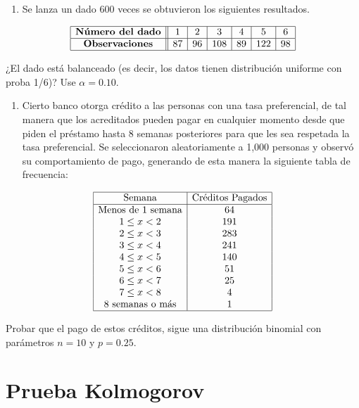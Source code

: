 \documentclass[
  a4paper,
  oneside,
  openany]{book}
\providecommand{\tightlist}{%
  \setlength{\itemsep}{0pt}\setlength{\parskip}{0pt}}
\begin{document}
\begin{enumerate}
\def\labelenumi{\arabic{enumi}.}
\tightlist
\item
  Se lanza un dado 600 veces se obtuvieron los siguientes resultados.
\end{enumerate}

\[
\begin{array}{|c ||c |c |c|c|c|c|}
\hline 
\textbf{Número del dado} & 1& 2& 3&4&5&6 \\
\hline 
\textbf{Observaciones} & 87 &  96 &108&89&122&98 \\
 \hline 
\end{array}
\]

¿El dado está balanceado (es decir, los datos tienen distribución uniforme con proba 1/6)? Use \(\alpha=0.10.\)

\begin{enumerate}
\def\labelenumi{\arabic{enumi}.}
\setcounter{enumi}{1}
\tightlist
\item
  Cierto banco otorga crédito a las personas con una tasa preferencial, de tal manera que los acreditados pueden pagar en cualquier momento desde que piden el préstamo hasta 8 semanas posteriores para que les sea respetada la tasa preferencial. Se seleccionaron aleatoriamente a 1,000 personas y observó su comportamiento de pago, generando de esta manera la siguiente tabla de frecuencia:
\end{enumerate}

\[
\begin{array}{|c|c|  }
\hline
\mbox{Semana}& \mbox{Créditos Pagados}\\
\hline
\mbox{Menos de 1  semana} &64\\
1 \leq x < 2& 191\\
2 \leq  x < 3 &283\\
3 \leq  x < 4 &241\\
4 \leq  x < 5 &140\\
5 \leq  x < 6 &51\\
6 \leq  x < 7 &25\\
7 \leq  x < 8 &4\\
\mbox{8 semanas o más} & 1\\
\hline
\end{array}
\]

Probar que el pago de estos créditos, sigue una distribución binomial con parámetros \(n = 10\) y \(p = 0.25\).

\hypertarget{prueba-kolmogorov}{%
\chapter{Prueba Kolmogorov}\label{prueba-kolmogorov}}
\end{document}
